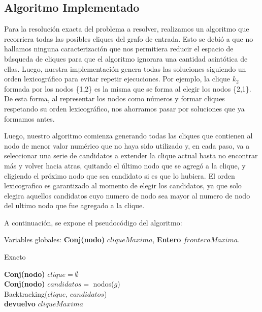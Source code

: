 \subsection{Algoritmo Implementado}

Para la resolución exacta del problema a resolver, realizamos un algoritmo que recorriera todas las posibles cliques del grafo de entrada. Esto se debió a que no hallamos ninguna caracterización que nos permitiera reducir el espacio de búsqueda de cliques para que el algoritmo ignorara una cantidad asintótica de ellas. Luego, nuestra implementación genera todas las soluciones siguiendo un orden lexicográfico para evitar repetir ejecuciones. Por ejemplo, la clique $k_{2}$ formada por los nodos \{1,2\} es la misma que se forma al elegir los nodos \{2,1\}. De esta forma, al representar los nodos como números y formar cliques respetando su orden lexicográfico, nos ahorramos pasar por soluciones que ya formamos antes. %

Luego, nuestro algoritmo comienza generando todas las cliques que contienen al nodo de menor valor numérico que no haya sido utilizado y, en cada paso, va a seleccionar una serie de candidatos a extender la clique actual hasta no encontrar más y volver hacia atras, quitando el último nodo que se agregó a la clique, y eligiendo el próximo nodo que sea candidato si es que lo hubiera. El orden lexicografico es garantizado al momento de elegir los candidatos, ya que solo elegira aquellos candidatos cuyo numero de nodo sea mayor al numero de nodo del ultimo nodo que fue agregado a la clique.

A continuación, se expone el pseudocódigo del algoritmo:

Variables globales: \textbf{Conj(nodo)} $cliqueMaxima$, \textbf{Entero} $fronteraMaxima$.\\

\begin{algorithm}[H]
	\SetAlgoLined
	\caption{Exacto}

	\textbf{Conj(nodo)} $clique = \emptyset$\\
	\textbf{Conj(nodo)} $candidatos = $ nodos($g$)\\

	Backtracking($clique$, $candidatos$)\\

	\textbf{devuelvo} $cliqueMaxima$\\

\end{algorithm}

